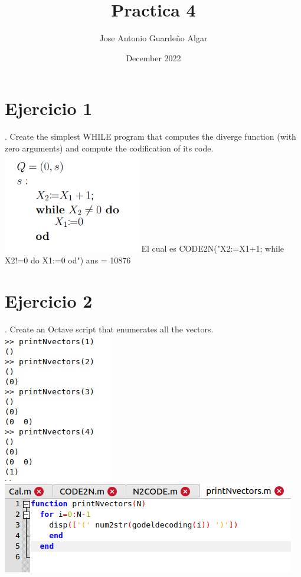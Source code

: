 \documentclass{article}
\title{Practica 4}
\author{Jose Antonio Guardeño Algar}
\date{December 2022}
\begin{document}
\maketitle
\section{Ejercicio 1}
. Create the simplest WHILE program that computes the diverge function (with zero arguments) and compute the codification of its code.
\newline
\includegraphics[width=6cm]{imagen_2022-12-26_164453139.png}
\newline
El cual es CODE2N("X2:=X1+1; while X2!=0 do X1:=0 od")
ans = 10876
\maketitle
\section{Ejercicio 2}
\maketitle
{}. Create an Octave script that enumerates all the vectors.
\newline
\includegraphics{praactica42.jpg}
\newline
\includegraphics{imagen_2022-12-26_173832950.png}
\end{document}
